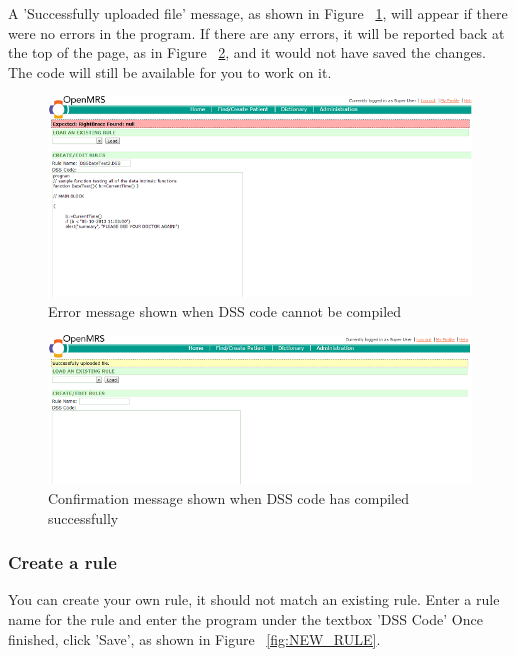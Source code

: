 \documentclass[12pt,letterpaper]{article}
\begin{document}
A 'Successfully uploaded file' message, as shown in 
Figure ~\ref{fig:MODIFY_ERROR}, will appear if there were no errors in the program. 
If there are any errors, it will be reported back at the top of the page, as in Figure ~\ref{fig:MODIFY_SUCCESS}, and it would not have saved the changes. 
The code will still be available for you to work on it.


\begin{figure}[htbp]
\begin{center}
\includegraphics[width=6.5in]{user_guide/modify_error.png}
\end{center}
\caption{Error message shown when DSS code cannot be compiled}
\label{fig:MODIFY_ERROR}
\end{figure}

\begin{figure}[htbp]
\begin{center}
\includegraphics[width=6.5in]{user_guide/modify_success.png}
\end{center}
\caption{Confirmation message shown when DSS code has compiled successfully}
\label{fig:MODIFY_SUCCESS}
\end{figure}

\newpage
\subsubsection{Create a rule} \label{sec:CREATE_RULE}
You can create your own rule, it should not match an existing rule. Enter a rule name for the rule and enter the program under the textbox 'DSS Code' Once finished, click 'Save', as shown in Figure ~\ref{fig:NEW_RULE}.
\end{document}
